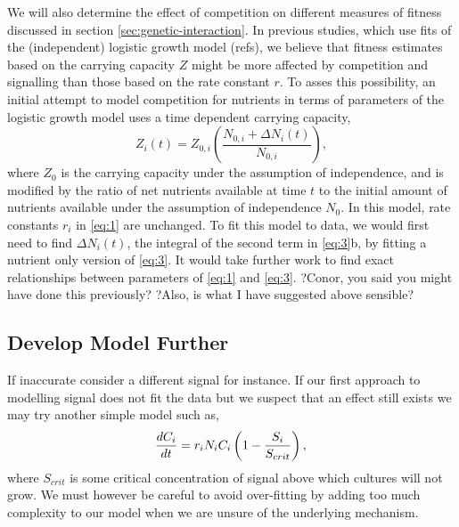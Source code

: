 We will also determine the effect of competition on different measures
of fitness discussed in section \ref{sec:genetic-interaction}. In
previous studies, which use fits of the (independent) logistic growth
model (refs), we believe that fitness estimates based on the carrying
capacity \(Z\) might be more affected by competition and signalling
than those based on the rate constant \(r\).  To asses this
possibility, an initial attempt to model competition for nutrients in
terms of parameters of the logistic growth model uses a time dependent
carrying capacity,
\begin{equation}
  \label{eq:5}
  Z_{i}(t) = Z_{0,i}\left(\frac{N_{0,i} + \Delta N_{i}(t)}{N_{0,i}}\right),
\end{equation}
where \(Z_{0}\) is the carrying capacity under the assumption of
independence, and is modified by the ratio of net nutrients available
at time \(t\) to the initial amount of nutrients available under the
assumption of independence \(N_{0}\). In this model, rate constants
\(r_{i}\) in \ref{eq:1} are unchanged. To fit this model to data, we
would first need to find \(\Delta N_{i}(t)\), the integral of the
second term in \ref{eq:3}b, by fitting a nutrient only version of
\ref{eq:3}. It would take further work to find exact relationships
between parameters of \ref{eq:1} and \ref{eq:3}. ?Conor, you said you
might have done this previously?  ?Also, is what I have suggested
above sensible?


\subsection{Develop Model Further}
\label{sec:dev-mod-further}
If inaccurate consider a different signal for instance. If our first
approach to modelling signal does not fit the data but we suspect that
an effect still exists we may try another simple model such as,
\begin{equation}
  \label{eq:6}
  \frac{dC_{i}}{dt} = r_{i}N_{i}C_{i}\left(1 - \frac{S_{i}}{S_{crit}}\right),\\
\end{equation}
where \(S_{crit}\) is some critical concentration of signal above
which cultures will not grow. We must however be careful to avoid
over-fitting by adding too much complexity to our model when we are
unsure of the underlying mechanism.

